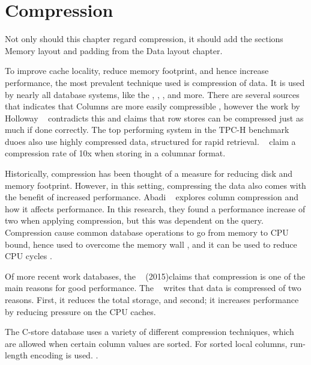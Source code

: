 \chapter{Compression}
\label{chap:Compression}
\begin{secex}
  Not only should this chapter regard compression, it should add the sections Memory layout and padding from the Data layout chapter.
\end{secex}
\newpage
To improve cache locality, reduce memory footprint, and hence increase performance, the most prevalent technique used is compression of data. It is used by nearly all database systems, like the  \cite{Raman2013-em},  \cite{Stonebraker2005-qz},  \cite{Lamb2012-kg}, and more. There are several sources that indicates that Columns are more easily compressible , however the work by Holloway \ea~\cite{Holloway2008-rr} contradicts this and claims that row stores can be compressed just as much if done correctly. The top performing system in the TPC-H benchmark duoes also use highly compressed data, structured for rapid retrieval. \mssql~\cite{noauthor_undated-vq} claim a compression rate of 10x when storing in a columnar format.

Historically, compression has been thought of a measure for reducing disk and memory footprint. However, in this setting, compressing the data also comes with the benefit of increased performance. Abadi \ea~\cite{Abadi2008-dd} explores column compression and how it affects performance. In this research, they found a performance increase of two when applying compression, but this was dependent on the query. Compression cause common database operations to go from memory to CPU bound, hence used to overcome the memory wall \cite{Willhalm2009-hu}, and it can be used to reduce CPU cycles \cite{Stonebraker2005-qz}.

Of more recent work databases, the \gorilla~\cite{Pikonen2015-ko} (2015)claims that compression is one of the main reasons for good performance. The \exasol~\cite{Exasol2015-xh} writes that data is compressed of two reasons. First, it reduces the total storage, and second; it increases performance by reducing pressure on the CPU caches.

The C-store database uses a variety of different compression techniques, which are allowed when certain column values are sorted. For sorted local columns, run-length encoding is used. .

